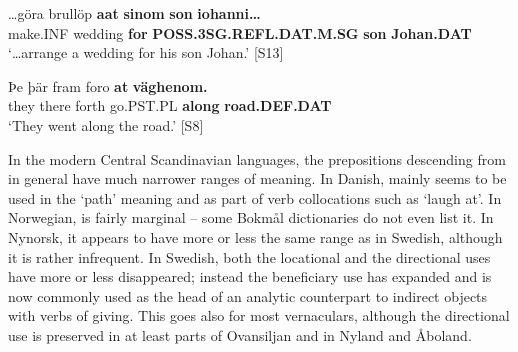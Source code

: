  \ea\label{}
\gll …göra  brullöp  \textbf{aat} \textbf{sinom} \textbf{son} \textbf{iohanni…}\\


make.INF  wedding  \textbf{for} \textbf{POSS.3SG.REFL.DAT.M.SG} \textbf{son} \textbf{Johan.DAT}\\

\glt ‘…arrange a wedding for his son Johan.’ [S13]

\z

\item 


 \ea\label{}
\gll Þe  þär  fram  foro  \textbf{at} \textbf{väghenom.}\\


they  there  forth  go.PST.PL  \textbf{along} \textbf{road.DEF.DAT}\\

\glt ‘They went along the road.’ [S8]

\z

In the modern Central Scandinavian languages, the prepositions descending from  in general have much narrower ranges of meaning. In Danish, mainly seems to be used in the ‘path’ meaning and as part of verb collocations such as  ‘laugh at’. In Norwegian,  is fairly marginal – some Bokmål dictionaries do not even list it. In Nynorsk, it appears to have more or less the same range as in Swedish, although it is rather infrequent. In Swedish, both the locational and the directional uses have more or less disappeared; instead the beneficiary use has expanded and is now commonly used as the head of an analytic counterpart to indirect objects with verbs of giving. This goes also for most vernaculars, although the directional use is preserved in at least parts of Ovansiljan and in Nyland and Åboland. 


